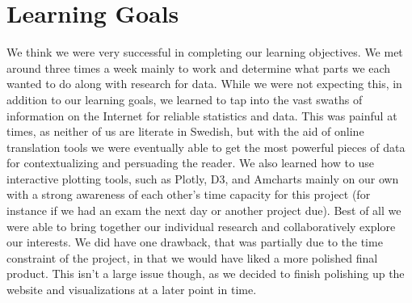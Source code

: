 \documentclass[10pt]{article}
\begin{document}
\section{Learning Goals}
We think we were very successful in completing our learning objectives. We met around three times a week mainly to work and determine what parts we each wanted to do along with research for data. While we were not expecting this, in addition to our learning goals, we learned to tap into the vast swaths of information on the Internet for reliable statistics and data. This was painful at times, as neither of us are literate in Swedish, but with the aid of online translation tools we were eventually able to get the most powerful pieces of data for contextualizing and persuading the reader. We also learned how to use interactive plotting tools, such as Plotly, D3, and Amcharts mainly on our own with a strong awareness of each other’s time capacity for this project (for instance if we had an exam the next day or another project due). Best of all we were able to bring together our individual research and collaboratively explore our interests. We did have one drawback, that was partially due to the time constraint of the project, in that we would have liked a more polished final product. This isn’t a large issue though, as we decided to finish polishing up the website and visualizations at a later point in time.
\end{document}

